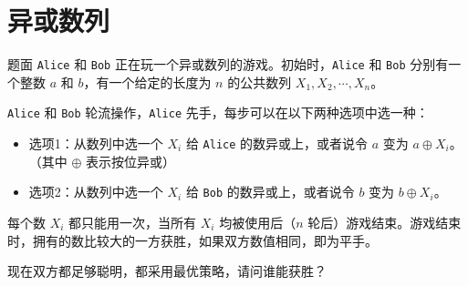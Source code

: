 \documentclass{pptt}
\begin{document}
\section{异或数列}

\begin{frame}{题面}
    \texttt{Alice} 和 \texttt{Bob} 正在玩一个异或数列的游戏。初始时，\texttt{Alice} 和 \texttt{Bob} 分别有一个整数 $a$ 和 $b$，有一个给定的长度为 $n$ 的公共数列 $X_1,X_2,\cdots,X_n$。

    \texttt{Alice} 和 \texttt{Bob} 轮流操作，\texttt{Alice} 先手，每步可以在以下两种选项中选一种：

    \begin{itemize}
        \item 选项1：从数列中选一个 $X_i$ 给 \texttt{Alice} 的数异或上，或者说令 $a$ 变为 $a \oplus X_i$。（其中 $\oplus$ 表示按位异或）
        \item 选项2：从数列中选一个 $X_i$ 给 \texttt{Bob} 的数异或上，或者说令 $b$ 变为 $b \oplus X_i$。
    \end{itemize}

    每个数 $X_i$ 都只能用一次，当所有 $X_i$ 均被使用后（$n$ 轮后）游戏结束。游戏结束时，拥有的数比较大的一方获胜，如果双方数值相同，即为平手。

    现在双方都足够聪明，都采用最优策略，请问谁能获胜？
\end{frame}
\end{document}

